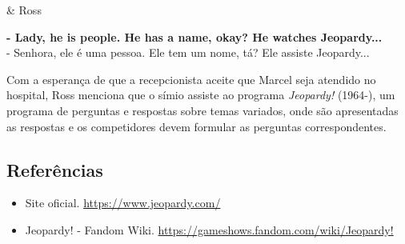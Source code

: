 \begin{tcolorbox}[enhanced,center upper,
    drop fuzzy shadow southeast, boxrule=0.3pt,
    lower separated=false, breakable,
    colframe=black!30!dialogoBorder,colback=white]
\begin{minipage}[c]{0.16\linewidth}
   & \centering \scriptsize{Ross}
\end{minipage}
\hfill
\begin{minipage}[c]{0.8\linewidth}
  \textbf{- Lady, he is people. He has a name, okay? He watches Jeopardy...}\\
  - Senhora, ele é uma pessoa. Ele tem um nome, tá? Ele assiste Jeopardy...
\end{minipage}
\end{tcolorbox}

Com a esperança de que a recepcionista aceite que Marcel seja atendido
no hospital, Ross menciona que o símio assiste ao programa
\emph{Jeopardy!} (1964-), um programa de perguntas e respostas sobre
temas variados, onde são apresentadas as respostas e os competidores
devem formular as perguntas correspondentes.

\hypertarget{referuxeancias-5}{%
\subsection{Referências}\label{referuxeancias-5}}

\begin{itemize}
\tightlist
\item
  \sloppy Site oficial. \url{https://www.jeopardy.com/}
\item
  \sloppy Jeopardy! - Fandom Wiki. \url{https://gameshows.fandom.com/wiki/Jeopardy!}
\end{itemize}
